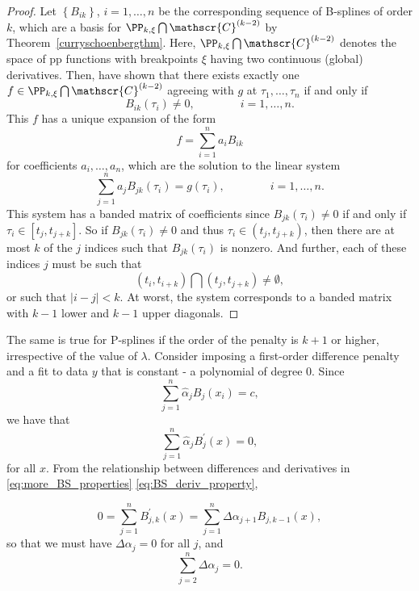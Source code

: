 \documentclass[12pt]{article}
\begin{document}
\begin{enumerate}
\begin{description}
\begin{proof}
Let $\left\{ B_{ik} \right\}$, $i=1,\dots,n$ be the corresponding sequence of B-splines of order $k$, which are a basis for $\PP_{k,\xi} \bigcap \mathscr{C}^{\left(k-2\right)}$ by Theorem~\ref{curryschoenbergthm}. Here, $\PP_{k,\xi} \bigcap \mathscr{C}^{\left(k-2\right)}$ denotes the space of pp functions with breakpoints $\xi$ having two continuous (global) derivatives. Then, \cite{schoenberg1953polya} have shown that there exists exactly one $f \in \PP_{k,\xi} \bigcap \mathscr{C}^{\left(k-2\right)}$ agreeing with $g$ at $\tau_1,\dots, \tau_n$ if and only if 
\[
B_{ik}\left(\tau_i\right) \ne 0, \qquad \qquad i=1,\dots,n.
\]
This $f$ has a unique expansion of the form
\[
f = \sum_{i=1}^n a_i B_{ik}
\] 
for coefficients $a_i,\dots, a_n$, which are the solution to the linear system
\[
\sum_{j=1}^n a_jB_{jk}\left(\tau_i\right) = g\left(\tau_i\right), \qquad \qquad i=1,\dots,n.
\]
This system has a banded matrix of coefficients since $B_{jk}\left(\tau_i\right) \ne 0$ if and only if $\tau_i \in \left[t_j,t_{j+k}\right]$. So if $B_{jk}\left(\tau_i\right) \ne 0$ and thus $\tau_i \in \left(t_j,t_{j+k}\right)$, then there are at most $k$ of the $j$ indices such that $B_{jk}\left(\tau_i\right)$ is nonzero. And further, each of these indices $j$ must be such that 
\[
\left(t_i,t_{i+k}\right) \bigcap \left(t_j,t_{j+k}\right) \ne \emptyset,
\]
or such that $\vert i-j \vert < k$. At worst, the system corresponds to a banded matrix with $k-1$ lower and $k-1$ upper diagonals. 
\end{proof}
The same is true for P-splines if the order of the penalty is $k+1$ or higher, irrespective of the value of $\lambda$. Consider imposing a first-order difference penalty and a fit to data $y$ that is constant - a polynomial of degree 0. Since 
\[
\sum_{j=1}^n \hat{\alpha}_j B_j\left( x_i \right) = c, 
\]
\noindent
we have that
\[
\sum_{j=1}^n \hat{\alpha}_j B^\prime_j\left( x \right) = 0, 
\]
\noindent
for all $x$. From the relationship between differences and derivatives in \ref{eq:more_BS_properties} \ref{eq:BS_deriv_property}, 

\[
0 = \sum_{j=1}^n B^\prime_{j,k}\left(x\right) = \sum_{j=1}^n \Delta\alpha_{j+1} B_{j,k-1}\left( x \right), 
\]
\noindent
so that we must have $\Delta \alpha_j = 0$ for all $j$, and 
\[
\sum_{j=2}^n \Delta \alpha_j = 0.
\]


\end{description}
\end{enumerate}
\end{document}
